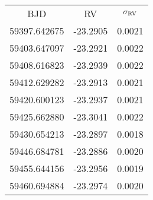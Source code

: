 \begin{table}
\begin{tabular}{ccc}
BJD & RV & $\sigma_{\rm RV}$ \\
59397.642675 & -23.2905 & 0.0021 \\
59403.647097 & -23.2921 & 0.0022 \\
59408.616823 & -23.2939 & 0.0022 \\
59412.629282 & -23.2913 & 0.0021 \\
59420.600123 & -23.2937 & 0.0021 \\
59425.662880 & -23.3041 & 0.0022 \\
59430.654213 & -23.2897 & 0.0018 \\
59446.684781 & -23.2886 & 0.0020 \\
59455.644156 & -23.2956 & 0.0019 \\
59460.694884 & -23.2974 & 0.0020 \\
\end{tabular}
\end{table}
